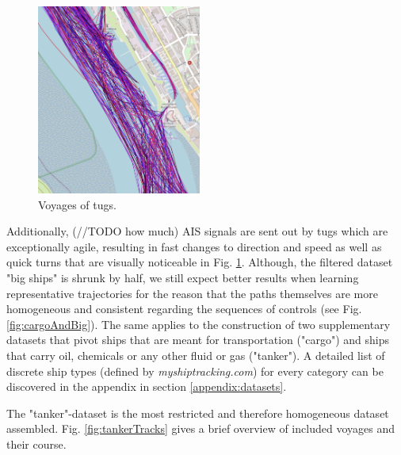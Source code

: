 \begin{figure}
    \includegraphics[width=0.48\textwidth]{images/ais/tracks/Tugs.png}
    \caption{Voyages of tugs.}
    \label{fig:tugs}
\end{figure}
Additionally, (//TODO how much) AIS signals are sent out by tugs which are exceptionally agile, resulting in fast changes to direction and speed as well as quick turns that are visually noticeable in Fig. \ref{fig:tugs}. Although, the filtered dataset "big ships" is shrunk by half, we still expect better results when learning representative trajectories for the reason that the paths themselves are more homogeneous and consistent regarding the sequences of controls (see Fig. \ref{fig:cargoAndBig}). The same applies to the construction of two supplementary datasets that pivot ships that are meant for transportation ("cargo") and ships that carry oil, chemicals or any other fluid or gas ("tanker"). A detailed list of discrete ship types (defined by \textit{myshiptracking.com}) for every category can be discovered in the appendix in section \ref{appendix:datasets}.
\par
The "tanker"-dataset is the most restricted and therefore homogeneous dataset assembled. Fig. \ref{fig:tankerTracks} gives a brief overview of included voyages and their course.
